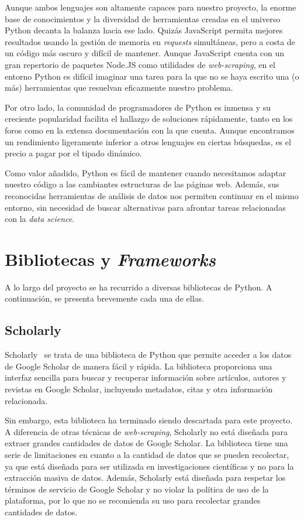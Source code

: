 Aunque ambos lenguajes son altamente capaces para nuestro proyecto, la enorme base de conocimientos y la diversidad de herramientas creadas en el universo Python decanta la balanza hacia ese lado. Quizás JavaScript permita mejores resultados usando la gestión de memoria en \textit{requests} simultáneas, pero a costa de un código más oscuro y difícil de mantener. Aunque JavaScript cuenta con un gran repertorio de paquetes Node.JS como utilidades de \textit{web-scraping}, en el entorno Python es difícil imaginar una tarea para la que no se haya escrito una (o más) herramientas que resuelvan eficazmente nuestro problema. 

Por otro lado, la comunidad de programadores de Python es inmensa y su creciente popularidad facilita el hallazgo de soluciones rápidamente, tanto en los foros como en la extensa documentación con la que cuenta. Aunque encontramos un rendimiento ligeramente inferior a otros lenguajes en ciertas búsquedas, es el precio a pagar por el tipado dinámico. 

Como valor añadido, Python es fácil de mantener cuando necesitamos adaptar nuestro código a las cambiantes estructuras de las páginas web. Además, sus reconocidas herramientas de análisis de datos nos permiten continuar en el mismo entorno, sin necesidad de buscar alternativas para afrontar tareas relacionadas con la \textit{data science}.

\section{Bibliotecas y \textit{Frameworks}}
A lo largo del proyecto se ha recurrido a diversas bibliotecas de Python. A continuación, se presenta brevemente cada una de ellas.

\subsection{Scholarly}
Scholarly~\cite{scholarly} se trata de una biblioteca de Python que permite acceder a los datos de Google Scholar de manera fácil y rápida. La biblioteca proporciona una interfaz sencilla para buscar y recuperar información sobre artículos, autores y revistas en Google Scholar, incluyendo metadatos, citas y otra información relacionada.

Sin embargo, esta biblioteca ha terminado siendo descartada para este proyecto. A diferencia de otras técnicas de \textit{web-scraping}, Scholarly no está diseñada para extraer grandes cantidades de datos de Google Scholar. La biblioteca tiene una serie de limitaciones en cuanto a la cantidad de datos que se pueden recolectar, ya que está diseñada para ser utilizada en investigaciones científicas y no para la extracción masiva de datos. Además, Scholarly está diseñada para respetar los términos de servicio de Google Scholar y no violar la política de uso de la plataforma, por lo que no se recomienda su uso para recolectar grandes cantidades de datos.

